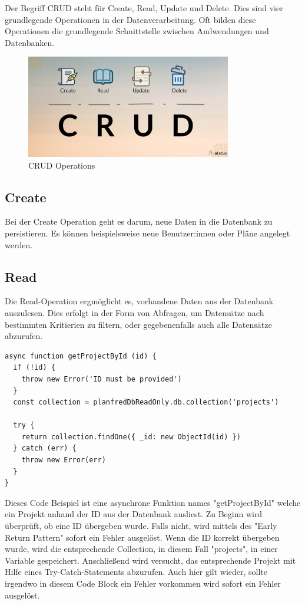 Der Begriff CRUD steht für Create, Read, Update und Delete. Dies sind vier grundlegende Operationen in der Datenverarbeitung. Oft bilden diese Operationen die grundlegende Schnittstelle zwischen Andwendungen und Datenbanken.
\newline
\begin{figure}[h!]
    \centering
    \includegraphics[width=0.8\textwidth]{pics/CRUD.jpeg}
    \caption{CRUD Operations}
    \label{fig:enter-label}
\end{figure}


 \subsection{Create}

 Bei der Create Operation geht es darum, neue Daten in die Datenbank zu persistieren. Es können beispielsweise neue Benutzer:innen oder Pläne angelegt werden.


 \subsection{Read}

 Die Read-Operation ergmöglicht es, vorhandene Daten aus der Datenbank auszulesen. Dies erfolgt in der Form von Abfragen, um Datensätze nach bestimmten Kritierien zu filtern, oder gegebenenfalls auch alle Datensätze abzurufen.

\begin{lstlisting}[caption=Read-Operation]
async function getProjectById (id) {
  if (!id) {
    throw new Error('ID must be provided')
  }
  const collection = planfredDbReadOnly.db.collection('projects')

  try {
    return collection.findOne({ _id: new ObjectId(id) })
  } catch (err) {
    throw new Error(err)
  }
}
\end{lstlisting}

Dieses Code Beispiel ist eine asynchrone Funktion names "getProjectById" welche ein Projekt anhand der ID aus der Datenbank ausliest.\newline
Zu Beginn wird überprüft, ob eine ID übergeben wurde. Falls nicht, wird mittels des "Early Return Pattern" sofort ein Fehler ausgelöst. Wenn die ID korrekt übergeben wurde, wird die entsprechende Collection, in diesem Fall "projects", in einer Variable gespeichert. Anschließend wird versucht, das entsprechende Projekt mit Hilfe eines Try-Catch-Statements abzurufen. Auch hier gilt wieder, sollte irgendwo in diesem Code Block ein Fehler vorkommen wird sofort ein Fehler ausgelöst.



